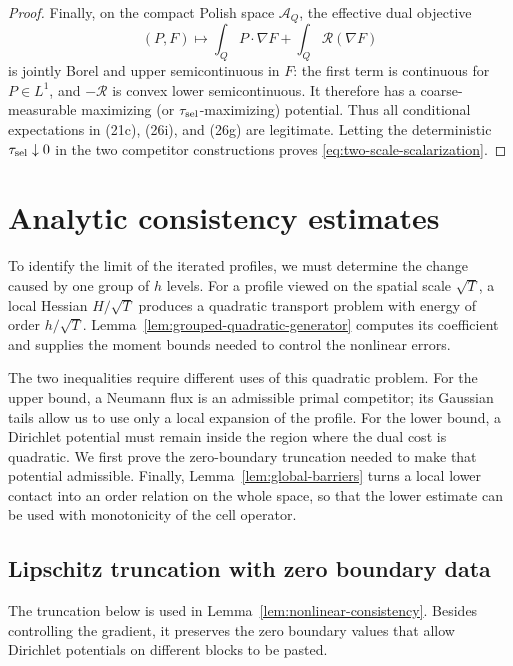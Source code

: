 \documentclass{aomart}
\theoremstyle{definition}
\newcommand{\1}{\mathbf 1}
\begin{document}
\begin{proof}
Finally, on the compact Polish space $\mathscr A_ Q$, the effective
dual objective
\begin{equation}
(P,F)\longmapsto\int_ QP\cdot\nabla F+\int_ Q\mathcal R(\nabla F)
\tag{26s}
\end{equation}
is jointly Borel and upper semicontinuous in $F$: the first term is
continuous for $P\in L^1$, and $-\mathcal R$ is convex lower
semicontinuous.  It therefore has a coarse-measurable maximizing (or
$\tau_{\rm sel}$-maximizing) potential.  Thus all conditional expectations in
(21c), (26i), and (26g) are legitimate.  Letting the deterministic
$\tau_{\rm sel}\downarrow0$ in the two
competitor constructions proves \eqref{eq:two-scale-scalarization}.

\end{proof}

\section{Analytic consistency estimates}\label{sec:consistency}

To identify the limit of the iterated profiles, we must determine the
change caused by one group of $h$ levels.  For a profile viewed on the
spatial scale $\sqrt T$, a local Hessian $H/\sqrt T$ produces a
quadratic transport problem with energy of order $h/\sqrt T$.
Lemma~\ref{lem:grouped-quadratic-generator} computes its coefficient
and supplies the moment bounds needed to control the nonlinear errors.

The two inequalities require different uses of this quadratic problem.
For the upper bound, a Neumann flux is an admissible primal competitor;
its Gaussian tails allow us to use only a local expansion of the
profile.  For the lower bound, a Dirichlet potential must remain inside
the region where the dual cost is quadratic.  We first prove the
zero-boundary truncation needed to make that potential admissible.
Finally, Lemma~\ref{lem:global-barriers} turns a local lower contact
into an order relation on the whole space, so that the lower estimate
can be used with monotonicity of the cell operator.

\subsection{Lipschitz truncation with zero boundary data}

The truncation below is used in Lemma~\ref{lem:nonlinear-consistency}.
Besides controlling the gradient, it preserves the zero boundary values
that allow Dirichlet potentials on different blocks to be pasted.
\end{document}
